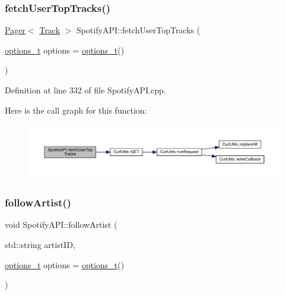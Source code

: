 \subsubsection{\texorpdfstring{fetch\+User\+Top\+Tracks()}{fetchUserTopTracks()}}
{\footnotesize\ttfamily \mbox{\hyperlink{class_pager}{Pager}}$<$ \mbox{\hyperlink{class_track}{Track}} $>$ Spotify\+A\+P\+I\+::fetch\+User\+Top\+Tracks (\begin{DoxyParamCaption}\item[{\mbox{\hyperlink{_spotify_a_p_i_8h_a0ff5cac1a4007bb330b7d9939650c283}{options\+\_\+t}}}]{options = {\ttfamily \mbox{\hyperlink{_spotify_a_p_i_8h_a0ff5cac1a4007bb330b7d9939650c283}{options\+\_\+t}}()} }\end{DoxyParamCaption})}



Definition at line 332 of file Spotify\+A\+P\+I.\+cpp.

Here is the call graph for this function\+:
\nopagebreak
\begin{figure}[H]
\begin{center}
\leavevmode
\includegraphics[width=350pt]{class_spotify_a_p_i_a6a15e5d679338e4bc8de8b6e74825d9c_cgraph}
\end{center}
\end{figure}
\mbox{\label{class_spotify_a_p_i_ae8eaa0d40f4a07af6354fac9f0452d47}} 
\subsubsection{\texorpdfstring{follow\+Artist()}{followArtist()}}
{\footnotesize\ttfamily void Spotify\+A\+P\+I\+::follow\+Artist (\begin{DoxyParamCaption}\item[{std\+::string}]{artist\+ID,  }\item[{\mbox{\hyperlink{_spotify_a_p_i_8h_a0ff5cac1a4007bb330b7d9939650c283}{options\+\_\+t}}}]{options = {\ttfamily \mbox{\hyperlink{_spotify_a_p_i_8h_a0ff5cac1a4007bb330b7d9939650c283}{options\+\_\+t}}()} }\end{DoxyParamCaption})}



